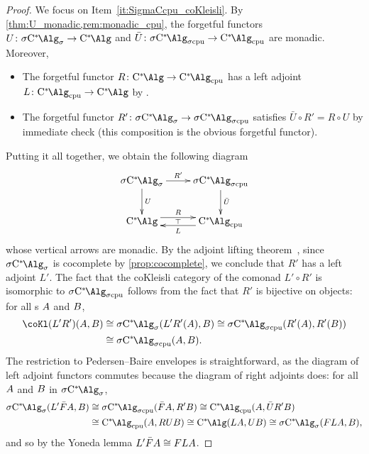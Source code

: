 \begin{proof}
	We focus on Item~\ref{it:SigmaCcpu_coKleisli}.
	By \cref{thm:U_monadic,rem:monadic_cpu}, the forgetful functors $U\colon \SigmaC \to \Calg$ and $\bar{U}\colon \SigmaCcpu \to \Calgcpu$ are monadic.
	Moreover,
	\begin{itemize}
		\item The forgetful functor $R\colon \Calg \to \Calgcpu$ has a left adjoint $L\colon \Calgcpu \to \Calg$ by \cite[Proposition 8]{kirchberg1998Cstarfromoperator}.
		\item The forgetful functor $R'\colon \SigmaC \to \SigmaCcpu$ satisfies $\bar{U}\circ R' = R\circ U$ by immediate check (this composition is the obvious forgetful functor).
	\end{itemize}
	Putting it all together, we obtain the following diagram
	\[
		\vxy{
		\SigmaC\ar[r]^-{R'} \ar[d]^U & \SigmaCcpu \ar[d]^{\bar{U}}\\
		\Calg \ar@<.4em>[r]^-R\ar@{<-}@<-.4em>[r]_-L\ar@{}[r]|-\top & \Calgcpu}
	\]
	whose vertical arrows are monadic.
	By the adjoint lifting theorem~\cite[Theorem 4.5.6]{borceux94handbook2}, since $\SigmaC$ is cocomplete by \cref{prop:cocomplete}, we conclude that $R'$ has a left adjoint $L'$.
	The fact that the coKleisli category of the comonad $L' \circ R'$ is isomorphic to $\SigmaCcpu$ follows from the fact that $R'$ is bijective on objects: for all \cstars{}s ${A}$ and ${B}$,
	\begin{align*}
		\coKl(L'R') (\A,\B) & \cong \SigmaC(L'R'(\A) , \B)\cong \SigmaCcpu(R'(\A),R'(\B)) \\
		                    & \cong \SigmaCcpu(\A,\B).
	\end{align*}
	The restriction to Pedersen--Baire envelopes is straightforward, as the diagram of left adjoint functors commutes because the diagram of right adjoints does: for all ${A}$ and ${B}$ in $\SigmaC$,
	\begin{align*}
		\SigmaC(L'\bar{F} \A,\B) & \cong  \SigmaCcpu (\bar{F}\A, R'\B) \cong \Calgcpu (\A,\bar{U}R' \B)      \\
		                         & \cong \Calgcpu (\A, RU\B) \cong \Calg(L\A,U\B) \cong \SigmaC(FL \A , \B),
	\end{align*}
	and so by the Yoneda lemma $L'\bar{F} {A}\cong FL {A}$.


\end{proof}
